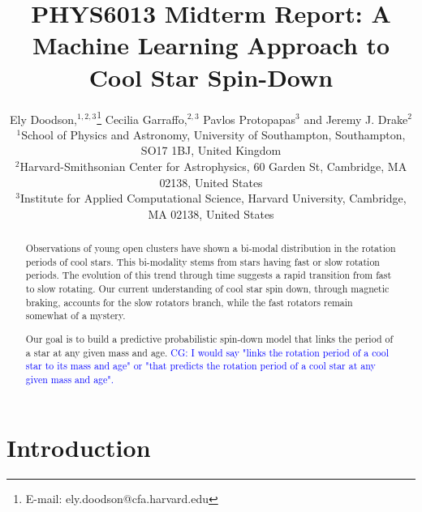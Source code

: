 \documentclass[fleqn,usenatbib]{mnras}
\title{PHYS6013 Midterm Report: A Machine Learning Approach to Cool Star Spin-Down}
\author[E. Doodson et al.]{
Ely Doodson,$^{1,2,3}$\thanks{E-mail: ely.doodson@cfa.harvard.edu}
Cecilia Garraffo,$^{2,3}$
Pavlos Protopapas$^{3}$
and Jeremy J. Drake$^{2}$
\\
$^{1}$School of Physics and Astronomy, University of Southampton,
Southampton, SO17 1BJ, United Kingdom\\
$^{2}$Harvard-Smithsonian Center for Astrophysics, 60 Garden St, Cambridge, MA 02138, United States \\
$^{3}$Institute for Applied Computational Science, Harvard University, Cambridge, MA 02138, United States
}
\begin{document}
\label{firstpage}
\pagerange{\pageref{firstpage}--\pageref{lastpage}}
\maketitle

\begin{abstract}
	Observations of young open clusters have shown a bi-modal distribution in the rotation periods of cool stars.
	This bi-modality stems from stars having fast or slow rotation periods.
	The evolution of this trend through time suggests a rapid transition from fast to slow rotating.
	Our current understanding of cool star spin down, through magnetic braking, accounts for the slow rotators branch, while the fast rotators remain somewhat of a mystery.

	Our goal is to build a predictive probabilistic spin-down model that links the period of a star at any given mass and age. \textcolor{blue}{CG: I would say "links the rotation period of a cool star to its mass and age" or "that predicts the rotation period of a cool star at any given mass and age". }
\end{abstract}


\section{Introduction}


\end{document}
